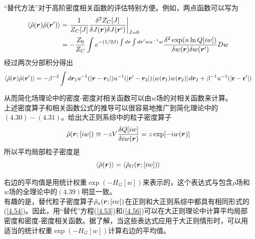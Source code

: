 “替代方法”对于高阶密度相关函数的评估特别方便。例如，两点函数可以写为\\
\begin{equation}
\begin{aligned}
\langle  \hat{ \rho } (\bm{r}) \hat{ \rho } (\bm{r}') \rangle &= \frac{1}{Z_{C}[J]} \frac{\delta ^{2}Z_{C}[J]}{\delta J(\bm{r}) \delta J(\bm{r}')} \bigg|_{J=0} \\&= -\frac{Z_0}{Z_{C}} \int  e^{-(1/2 \beta ) \int d\bm{r} \int d\bm{r}' w u^{-1} w } \frac{ \delta ^{2} \exp (n \ln Q[i w ])}{\delta w (\bm{r}) \delta w (\bm{r}')}D w
\end{aligned}
\label{4.55}
\end{equation}
经过两次分部积分得出\\
\begin{equation}
\langle  \hat{ \rho } (\bm{r}) \hat{ \rho } (\bm{r}') \rangle = - \beta ^{-2} \int d\bm{r}_{1}  u^{-1}(|\bm{r}-\bm{r}_{1}|) u^{-1}(|\bm{r}'-\bm{r}_{2}|) \langle w(\bm{r}_1) w(\bm{r}_2)\rangle d\bm{r}_{2} + \beta ^{-1} u^{-1} (|\mathbf{r-r'}|)
\label{4.56}
\end{equation}

从而简化场理论中的密度-密度对相关函数可以由$w$场的对相关函数来计算。\\

上述密度算子和相关函数公式的推导可以很容易地推广到简化理论中的$(4.30)-(4.31)$。给出大正则系综中的粒子密度算子\\
\begin{equation}
\tilde{ \rho }(\bm{r};[i w ]) \equiv -z V \frac{ \delta Q[i w]}{\delta i w (\bm{r})} = z \exp [-i w (\bm{r})]
\end{equation}
所以平均局部粒子密度是\\
\begin{equation}
\langle \tilde{ \rho } (\bm{r}) \rangle = \langle \tilde{ \rho }_{G}(\bm{r};[i w ]) \rangle
\end{equation}

右边的平均值是用统计权重$\exp ( -H_{G}[ w])$来表示的，这个表达式与包含$ \rho $场和$ w $场的全理论中的$(4.39)$明显一致。\\

有趣的是，替代粒子密度算子$ \tilde{ \rho }_{a}(\bm{r};[i w])$在正则和大正则系综中都具有相同形式的(\ref{4.54})。因此，用“替代”方程(\ref{4.53})和(\ref{4.56})可以在大正则理论中计算平均局部密度和密度-密度相关函数。据了解，当这些表达式应用于大正则情形时，可以用适当的统计权重$\exp (-H_{G}[ w ])$计算右边的平均值。\\

